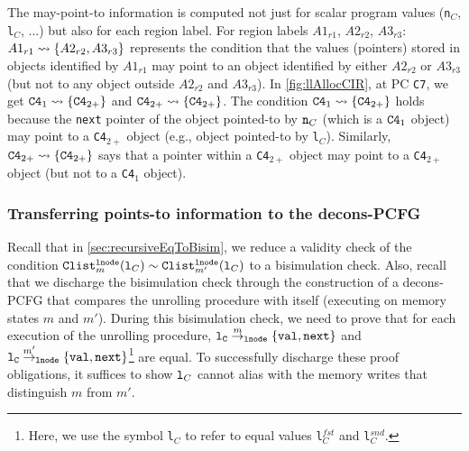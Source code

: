 The may-point-to information is computed not
just for scalar program values ({\tt n}$_C$,
{\tt l}$_C$, ...) but also for each region label.
For region labels $A1_{r1}$, $A2_{r2}$, $A3_{r3}$:
$A1_{r1}\rightsquigarrow{}\{A2_{r2},A3_{r3}\}$ represents
the condition that the values (pointers) stored
in objects identified
by $A1_{r1}$ may point to an object identified by
either $A2_{r2}$ or $A3_{r3}$ (but not to any object
outside $A2_{r2}$ and $A3_{r3}$).
In \cref{fig:llAllocCIR}, at PC {\tt C7}, we
get
${\tt C4}_{1}\rightsquigarrow{}\{{\tt C4}_{2+}\}$ and
${\tt C4}_{2+}\rightsquigarrow{}\{{\tt C4}_{2+}\}$.
The condition
${\tt C4}_{1}\rightsquigarrow{}\{{\tt C4}_{2+}\}$
holds because the {\tt next} pointer of the object
pointed-to by ${\tt n}_C$ (which
is a ${\tt C4}_1$ object) may point to
a {\tt C4}$_{2+}$ object (e.g., object pointed-to
by {\tt l}$_C$).
Similarly, ${\tt C4}_{2+}\rightsquigarrow{}\{{\tt C4}_{2+}\}$
says that a pointer within a {\tt C4}$_{2+}$ object
may point to a {\tt C4}$_{2+}$
object (but not to a {\tt C4}$_1$ object).

\subsubsection{Transferring points-to information to the decons-PCFG}
\label{sec:pointsToAsInvariants}
Recall that
in \cref{sec:recursiveEqToBisim},
we reduce a validity check of the condition
${\tt Clist}_m^{{\tt lnode}}({\tt l}_C)
\sim{} {\tt Clist}_{m'}^{{\tt lnode}}({\tt l}_C)$
to a bisimulation check. Also, recall
that we discharge the bisimulation check through the construction
of a decons-PCFG that compares the unrolling procedure with itself (executing
on memory states $m$ and $m'$).
During this bisimulation check, we need to prove
that for each execution
of the unrolling procedure, ${\tt {\tt l}_C} \overset{m}{\rightarrow}_{\tt lnode} {\tt \{val,next\}}$
and ${\tt {\tt l}_C} \overset{m'}{\rightarrow}_{\tt lnode} {\tt \{val,next\}}$\footnote{Here, we use the symbol {\tt l}$_C$ to
refer to equal values {\tt l}$^{fst}_C$ and
{\tt l}$^{snd}_C$.} are equal.
To successfully discharge these proof obligations, it suffices
to show ${\tt l}_C$ cannot alias with the memory writes that
distinguish $m$ from $m'$.


